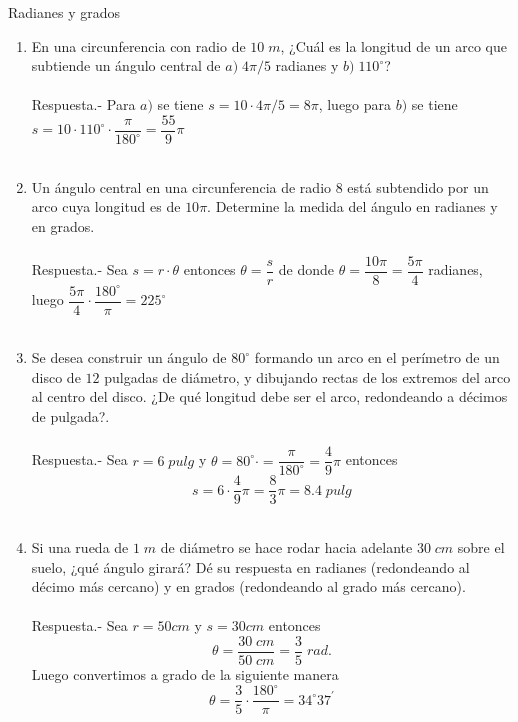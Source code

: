 Radianes y grados\\
\begin{enumerate}

\item En una circunferencia con radio de $10\; m$, ¿Cuál es la longitud de un arco que subtiende un  ángulo central de $a) \; 4\pi/5$ radianes y $b)\; 110^\circ$?\\\\
    Respuesta.-\; Para $a)$ se tiene $s=10 \cdot 4\pi/5 = 8\pi$, luego para $b)$ se tiene $s=10\cdot 110^\circ \cdot \dfrac{\pi}{180^\circ} = \dfrac{55}{9}\pi$\\\\

\item Un ángulo central en una circunferencia de radio $8$ está subtendido por un arco cuya longitud es de $10 \pi$. Determine la medida del ángulo en radianes y en grados.\\\\
    Respuesta.-\; Sea $s=r\cdot \theta$ entonces $\theta = \dfrac{s}{r}$ de donde $\theta = \dfrac{10\pi}{8} = \dfrac{5\pi}{4}$ radianes, luego $\dfrac{5\pi}{4}\cdot \dfrac{180^\circ}{\pi} = 225^\circ$\\\\

\item Se desea construir un ángulo de $80^\circ$ formando un arco en el perímetro de un disco de $12$ pulgadas de diámetro, y dibujando rectas de los extremos del arco al centro del disco. ¿De qué longitud debe ser el arco, redondeando a décimos de pulgada?.\\\\
    Respuesta.-\; Sea $r=6 \; pulg$ y $\theta = 80^\circ \cdot = \dfrac{\pi}{180^\circ}=\dfrac{4}{9}\pi$ entonces $$s=6\cdot \dfrac{4}{9}\pi = \dfrac{8}{3}\pi = 8.4\; pulg$$\\

\item Si una rueda de $1\;m$ de diámetro se hace rodar hacia adelante $30\; cm$ sobre el suelo, ¿qué ángulo girará? Dé su respuesta en radianes (redondeando al décimo más cercano) y en grados (redondeando al grado más cercano).\\\\
    Respuesta.-\; Sea $r=50cm$ y $s=30cm$ entonces $$\theta = \dfrac{30\; cm}{50 \; cm} = \dfrac{3}{5}\; rad.$$ Luego convertimos a grado de la siguiente manera $$\theta = \dfrac{3}{5}\cdot \dfrac{180^\circ}{\pi} = 34^{\circ}37^{'}$$ 


\end{enumerate}

